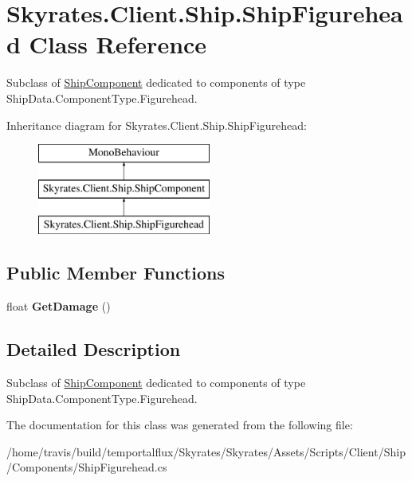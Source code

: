 \hypertarget{class_skyrates_1_1_client_1_1_ship_1_1_ship_figurehead}{\section{Skyrates.\-Client.\-Ship.\-Ship\-Figurehead Class Reference}
\label{class_skyrates_1_1_client_1_1_ship_1_1_ship_figurehead}
}


Subclass of \hyperlink{class_skyrates_1_1_client_1_1_ship_1_1_ship_component}{Ship\-Component} dedicated to components of type Ship\-Data.\-Component\-Type.\-Figurehead.  


Inheritance diagram for Skyrates.\-Client.\-Ship.\-Ship\-Figurehead\-:\begin{figure}[H]
\begin{center}
\leavevmode
\includegraphics[height=3.000000cm]{class_skyrates_1_1_client_1_1_ship_1_1_ship_figurehead}
\end{center}
\end{figure}
\subsection*{Public Member Functions}
\begin{DoxyCompactItemize}
\item 
\hypertarget{class_skyrates_1_1_client_1_1_ship_1_1_ship_figurehead_afe8df9d720684a3940b9659ae0f53245}{float {\bfseries Get\-Damage} ()}\label{class_skyrates_1_1_client_1_1_ship_1_1_ship_figurehead_afe8df9d720684a3940b9659ae0f53245}

\end{DoxyCompactItemize}


\subsection{Detailed Description}
Subclass of \hyperlink{class_skyrates_1_1_client_1_1_ship_1_1_ship_component}{Ship\-Component} dedicated to components of type Ship\-Data.\-Component\-Type.\-Figurehead. 



The documentation for this class was generated from the following file\-:\begin{DoxyCompactItemize}
\item 
/home/travis/build/temportalflux/\-Skyrates/\-Skyrates/\-Assets/\-Scripts/\-Client/\-Ship/\-Components/Ship\-Figurehead.\-cs\end{DoxyCompactItemize}

